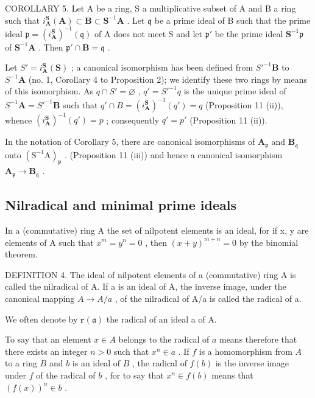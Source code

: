 COROLLARY 5. Let A be a ring, S a multiplicative subset of A and B a ring such that \(i_{\mathbf{A}}^{\mathbf{S}}(\mathbf{A}) \subset \mathbf{B} \subset \mathbf{S}^{-1}\mathbf{A}\) . Let \(\mathfrak{q}\) be a prime ideal of B such that the prime ideal \(\mathfrak{p} = (i_{\mathbf{A}}^{\mathbf{S}})^{-1}(\mathfrak{q})\) of A does not meet S and let \(\mathfrak{p}'\) be the prime ideal \(\mathbf{S}^{-1}\mathfrak{p}\) of \(\mathbf{S}^{-1}\mathbf{A}\) . Then \(\mathfrak{p}' \cap \mathbf{B} = \mathfrak{q}\) .

Let \(S' = i_{\mathbf{A}}^{\mathbf{S}}(\mathbf{S})\) ; a canonical isomorphism has been defined from \(S'^{-1}\mathbf{B}\) to \(S^{-1}\mathbf{A}\) (no. 1, Corollary 4 to Proposition 2); we identify these two rings by means of this isomorphism. As \(q \cap S' = \varnothing\) , \(q' = S'^{-1}q\) is the unique prime ideal of \(S^{-1}\mathbf{A} = S'^{-1}\mathbf{B}\) such that \(q' \cap B = (i_{\mathbf{A}}^{\mathbf{S}})^{-1}(q') = q\) (Proposition 11 (ii)), whence \((i_{\mathbf{A}}^{\mathbf{S}})^{-1}(q') = p\) ; consequently \(q' = p'\) (Proposition 11 (ii)).

In the notation of Corollary 5, there are canonical isomorphisms of \(\mathbf{A}_{\mathfrak{p}}\) and \(\mathbf{B}_{\mathfrak{q}}\) onto \((\mathrm{S}^{-1}\mathrm{A})_{\mathfrak{p}}\) . (Proposition 11 (iii)) and hence a canonical isomorphism \(\mathbf{A}_{\mathfrak{p}} \to \mathbf{B}_{\mathfrak{q}}\) .

\subsection{Nilradical and minimal prime ideals}

In a (commutative) ring A the set of nilpotent elements is an ideal, for if x, y are elements of A such that \(x^{m} = y^{n} = 0\) , then \((x + y)^{m+n} = 0\) by the binomial theorem.

DEFINITION 4. The ideal of nilpotent elements of a (commutative) ring A is called the nilradical of A. If a is an ideal of A, the inverse image, under the canonical mapping \(A \rightarrow A/a\) , of the nilradical of A/a is called the radical of a.

We often denote by \(\mathbf{r}(\mathfrak{a})\) the radical of an ideal a of A.

To say that an element \(x \in A\) belongs to the radical of \(a\) means therefore that there exists an integer \(n > 0\) such that \(x^n \in a\) . If \(f\) is a homomorphism from \(A\) to a ring \(B\) and \(b\) is an ideal of \(B\) , the radical of \(f(b)\) is the inverse image under \(f\) of the radical of \(b\) , for to say that \(x^n \in f(b)\) means that \((f(x))^n \in b\) .

